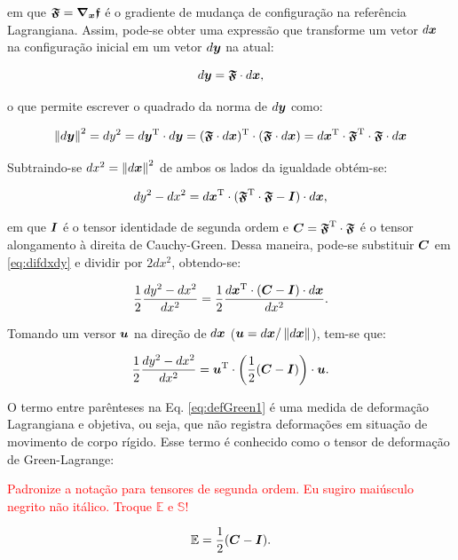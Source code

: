 \noindent em que $\boldsymbol{\mathfrak{F}}=\boldsymbol{\nabla_x}\boldsymbol{\mathfrak{f}}$ é o gradiente de mudança de configuração na referência Lagrangiana. Assim, pode-se obter uma expressão que transforme um vetor $d\boldsymbol{x}$ na configuração inicial em um vetor $d\boldsymbol{y}$ na atual:

\begin{equation}
    d\boldsymbol{y}=\boldsymbol{\mathfrak{F}}\cdot d\boldsymbol{x}\text{,}\label{eq:dyAdx}
\end{equation}

\noindent o que permite escrever o quadrado da norma de $d\boldsymbol{y}$ como:

\[
    \left\lVert{d\boldsymbol{y}}\right\lVert^2=dy^2=d\boldsymbol{y}^\mathrm{T}\cdot d\boldsymbol{y}=(\boldsymbol{\mathfrak{F}}\cdot d\boldsymbol{x})^\mathrm{T}\cdot(\boldsymbol{\mathfrak{F}}\cdot d\boldsymbol{x})=d\boldsymbol{x}^\mathrm{T}\cdot\boldsymbol{\mathfrak{F}}^\mathrm{T}\cdot\boldsymbol{\mathfrak{F}}\cdot d\boldsymbol{x}
\]

Subtraindo-se $dx^2=\left\lVert{d\boldsymbol{x}}\right\lVert^2$ de ambos os lados da igualdade obtém-se:

\begin{equation}
    dy^2-dx^2=d\boldsymbol{x}^\mathrm{T}\cdot(\boldsymbol{\mathfrak{F}}^\mathrm{T}\cdot\boldsymbol{\mathfrak{F}}-\boldsymbol{I})\cdot d\boldsymbol{x}\text{,}
    \label{eq:difdxdy}
\end{equation}

\noindent em que $\boldsymbol{I}$ é o tensor identidade de segunda ordem e $\boldsymbol{C}=\boldsymbol{\mathfrak{F}}^\mathrm{T}\cdot\boldsymbol{\mathfrak{F}}$ é o tensor alongamento à direita de Cauchy-Green. Dessa maneira, pode-se substituir $\boldsymbol{C}$ em \eqref{eq:difdxdy} e dividir por $2dx^2$, obtendo-se:

\[
    \frac{1}{2}\frac{dy^2-dx^2}{dx^2}=\frac{1}{2}\frac{d\boldsymbol{x}^\mathrm{T}\cdot(\boldsymbol{C}-\boldsymbol{I})\cdot d\boldsymbol{x}}{dx^2}\text{.}
\]

\noindent Tomando um versor $\boldsymbol{u}$ na direção de $d\boldsymbol{x}$ ($\boldsymbol{u}=d\boldsymbol{x}/\left\lVert{d\boldsymbol{x}}\right\lVert$), tem-se que:

\begin{equation}\label{eq:defGreen1}
    \frac{1}{2}\frac{dy^2-dx^2}{dx^2}=\boldsymbol{u}^\mathrm{T}\cdot\left(\frac{1}{2}(\boldsymbol{C}-\boldsymbol{I})\right)\cdot\boldsymbol{u}\text{.}
\end{equation}

O termo entre parênteses na Eq. \eqref{eq:defGreen1} é uma medida de deformação Lagrangiana e objetiva, ou seja, que não registra deformações em situação de movimento de corpo rígido. Esse termo é conhecido como o tensor de deformação de Green-Lagrange:


\textcolor{red}{Padronize a notação para tensores de segunda ordem. Eu sugiro maiúsculo negrito não itálico. Troque $\mathbb{E}$ e $\mathbb{S}$!}


\begin{equation}
    \mathbb{E}=\frac{1}{2}(\boldsymbol{C}-\boldsymbol{I})\text{.}
    \label{eq:CSD-DefGreenLagr}
\end{equation}

